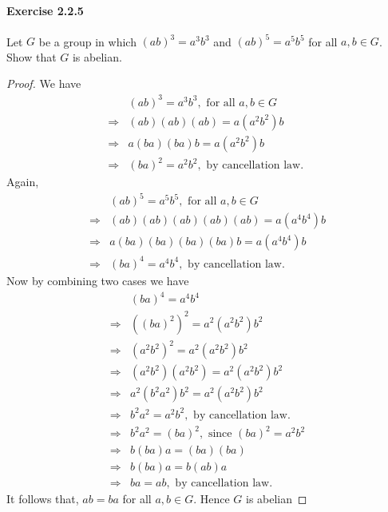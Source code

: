 \documentclass{article}
\begin{document}
\paragraph{Exercise 2.2.5} Let $G$ be a group in which $(a b)^{3}=a^{3} b^{3}$ and $(a b)^{5}=a^{5} b^{5}$ for all $a, b \in G$. Show that $G$ is abelian.
\begin{proof}
 We have
$$
\begin{aligned}
& (a b)^3=a^3 b^3, \text { for all } a, b \in G \\
\Longrightarrow & (a b)(a b)(a b)=a\left(a^2 b^2\right) b \\
\Longrightarrow & a(b a)(b a) b=a\left(a^2 b^2\right) b \\
\Longrightarrow & (b a)^2=a^2 b^2, \text { by cancellation law. }
\end{aligned}
$$
Again,
$$
\begin{aligned}
& (a b)^5=a^5 b^5, \text { for all } a, b \in G \\
\Longrightarrow & (a b)(a b)(a b)(a b)(a b)=a\left(a^4 b^4\right) b \\
\Longrightarrow & a(b a)(b a)(b a)(b a) b=a\left(a^4 b^4\right) b \\
\Longrightarrow & (b a)^4=a^4 b^4, \text { by cancellation law. }
\end{aligned}
$$
Now by combining two cases we have
$$
\begin{aligned}
& (b a)^4=a^4 b^4 \\
\Longrightarrow & \left((b a)^2\right)^2=a^2\left(a^2 b^2\right) b^2 \\
\Longrightarrow & \left(a^2 b^2\right)^2=a^2\left(a^2 b^2\right) b^2 \\
\Longrightarrow & \left(a^2 b^2\right)\left(a^2 b^2\right)=a^2\left(a^2 b^2\right) b^2 \\
\Longrightarrow & a^2\left(b^2 a^2\right) b^2=a^2\left(a^2 b^2\right) b^2 \\
\Longrightarrow & b^2 a^2=a^2 b^2, \text { by cancellation law. } \\
\Longrightarrow & b^2 a^2=(b a)^2, \text { since }(b a)^2=a^2 b^2 \\
\Longrightarrow & b(b a) a=(b a)(b a) \\
\Longrightarrow & b(b a) a=b(a b) a \\
\Longrightarrow & b a=a b, \text { by cancellation law. }
\end{aligned}
$$
It follows that, $a b=b a$ for all $a, b \in G$. Hence $G$ is abelian
\end{proof}
\end{document}
